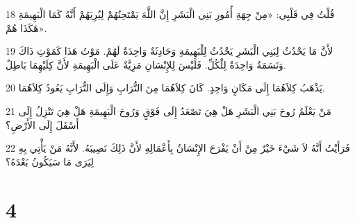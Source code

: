 \par 18 قُلْتُ فِي قَلْبِي: «مِنْ جِهَةِ أُمُورِ بَنِي الْبَشَرِ إِنَّ اللَّهَ يَمْتَحِنُهُمْ لِيُرِيَهُمْ أَنَّهُ كَمَا الْبَهِيمَةِ هَكَذَا هُمْ».
\par 19 لأَنَّ مَا يَحْدُثُ لِبَنِي الْبَشَرِ يَحْدُثُ لِلْبَهِيمَةِ وَحَادِثَةٌ وَاحِدَةٌ لَهُمْ. مَوْتُ هَذَا كَمَوْتِ ذَاكَ وَنَسَمَةٌ وَاحِدَةٌ لِلْكُلِّ. فَلَيْسَ لِلإِنْسَانِ مَزِيَّةٌ عَلَى الْبَهِيمَةِ لأَنَّ كِلَيْهِمَا بَاطِلٌ.
\par 20 يَذْهَبُ كِلاَهُمَا إِلَى مَكَانٍ وَاحِدٍ. كَانَ كِلاَهُمَا مِنَ التُّرَابِ وَإِلَى التُّرَابِ يَعُودُ كِلاَهُمَا.
\par 21 مَنْ يَعْلَمُ رُوحَ بَنِي الْبَشَرِ هَلْ هِيَ تَصْعَدُ إِلَى فَوْقٍ وَرُوحَ الْبَهِيمَةِ هَلْ هِيَ تَنْزِلُ إِلَى أَسْفَلَ إِلَى الأَرْضِ؟
\par 22 فَرَأَيْتُ أَنَّهُ لاَ شَيْءَ خَيْرٌ مِنْ أَنْ يَفْرَحَ الإِنْسَانُ بِأَعْمَالِهِ لأَنَّ ذَلِكَ نَصِيبَهُ. لأَنَّهُ مَنْ يَأْتِي بِهِ لِيَرَى مَا سَيَكُونُ بَعْدَهُ؟

\chapter{4}

